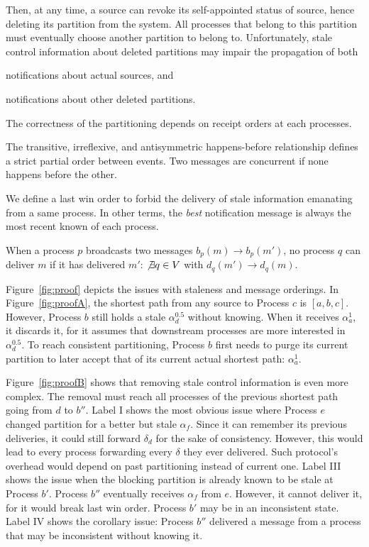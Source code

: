 Then, at any time, a source can revoke its self-appointed status of
source, hence deleting its partition from the system. All processes
that belong to this partition must eventually choose another partition
to belong to. Unfortunately, stale control information about deleted
partitions may impair the propagation of both
\begin{inparaenum}[(i)]
\item notifications about actual sources, and
\item notifications about other deleted partitions.
\end{inparaenum}
The correctness of the partitioning depends on receipt orders at each
processes.

\begin{definition}
  The transitive, irreflexive, and antisymmetric happens-before
  relationship defines a strict partial order between events. Two
  messages are concurrent if none happens before the other.
\end{definition}

We define a last win order to forbid the delivery of stale information
emanating from a same process. In other terms, the \emph{best}
notification message is always the most recent known of each process.
 
\begin{definition}
  When a process $p$ broadcasts two messages $b_p(m) \rightarrow
  b_p(m')$, no process $q$ can deliver $m$ if it has delivered $m'$:
  $\not\exists q \in V$ with $d_q(m') \rightarrow d_q(m)$.
\end{definition}

Figure~\ref{fig:proof} depicts the issues with staleness and message
orderings. In Figure~\ref{fig:proofA}, the shortest path from any
source to Process $c$ is $[a, b, c]$. However, Process $b$ still holds
a stale $\alpha_d^{0.5}$ without knowing. When it receives
$\alpha_a^1$, it discards it, for it assumes that downstream processes
are more interested in $\alpha_d^{0.5}$. To reach consistent
partitioning, Process $b$ first needs to purge its current partition
to later accept that of its current actual shortest path:
$\alpha_a^1$.

\noindent Figure~\ref{fig:proofB} shows that removing stale control
information is even more complex. The removal must reach all processes
of the previous shortest path going from $d$ to $b''$. Label I shows
the most obvious issue where Process $e$ changed partition for a
better but stale $\alpha_f$. Since it can remember its previous
deliveries, it could still forward $\delta_d$ for the sake of
consistency. However, this would lead to every process forwarding
every $\delta$ they ever delivered. Such protocol's overhead would
depend on past partitioning instead of current one. Label III shows
the issue when the blocking partition is already known to be stale at
Process $b'$. Process $b''$ eventually receives $\alpha_f$ from
$e$. However, it cannot deliver it, for it would break last win order.
Process $b'$ may be in an inconsistent state. Label IV shows the
corollary issue: Process $b''$ delivered a message from a process that
may be inconsistent without knowing it.

